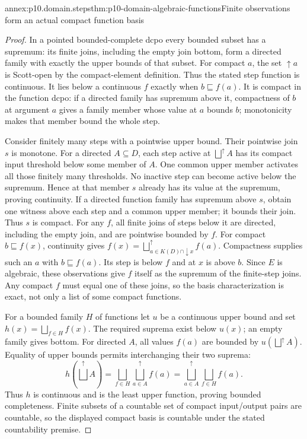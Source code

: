 \begin{annexitem}{annex:p10.domain.steps}{thm:p10-domain-algebraic-functions}{Finite observations form an actual compact function basis}
\begin{proof}
In a pointed bounded-complete dcpo every bounded subset has a
supremum: its finite joins, including the empty join bottom, form
a directed family with exactly the upper bounds of that subset.
For compact \(a\), the set \(\uparrow a\) is Scott-open by
the compact-element definition. Thus the stated step function
is continuous. It lies below a continuous \(f\) exactly when
\(b\sqsubseteq f(a)\). It is compact in the function dcpo:
if a directed family has supremum above it, compactness of
\(b\) at argument \(a\) gives a family member whose value at
\(a\) bounds \(b\); monotonicity makes that member bound
the whole step.

Consider finitely many steps with a pointwise upper bound. Their
pointwise join \(s\) is monotone. For a directed \(A\subseteq D\),
each step active at \(\bigsqcup^{\uparrow}A\) has its compact
input threshold below some member of \(A\). One common upper
member activates all those finitely many thresholds. No inactive
step can become active below the supremum. Hence at that member
\(s\) already has its value at the supremum, proving continuity.
If a directed function family has supremum above \(s\), obtain
one witness above each step and a common upper member; it bounds
their join. Thus \(s\) is compact.
For any \(f\), all finite joins of steps below it are directed,
including the empty join, and are pointwise bounded by \(f\).
For compact \(b\sqsubseteq f(x)\), continuity gives
\(f(x)=\bigsqcup_{a\in K(D)\cap\downarrow x}^{\uparrow}f(a)\).
Compactness supplies such an \(a\) with \(b\sqsubseteq f(a)\).
Its step is below \(f\) and at \(x\) is above \(b\).
Since \(E\) is algebraic, these observations give \(f\) itself
as the supremum of the finite-step joins. Any compact \(f\)
must equal one of these joins, so the basis characterization is
exact, not only a list of some compact functions.

For a bounded family \(H\) of functions let \(u\) be a continuous
upper bound and set \(h(x)=\bigsqcup_{f\in H}f(x)\). The required
suprema exist below \(u(x)\); an empty family gives bottom.
For directed \(A\), all values \(f(a)\) are bounded by
\(u(\bigsqcup^{\uparrow}A)\). Equality of upper bounds permits
interchanging their two suprema:
\[
 h(\bigsqcup^{\uparrow}A)
   =\bigsqcup_{f\in H}\bigsqcup_{a\in A}^{\uparrow}f(a)
   =\bigsqcup_{a\in A}^{\uparrow}\bigsqcup_{f\in H}f(a).
\]
Thus \(h\) is continuous and is the least upper function, proving
bounded completeness. Finite subsets of a countable set of compact
input/output pairs are countable, so the displayed compact basis
is countable under the stated countability premise.
\end{proof}
\end{annexitem}

